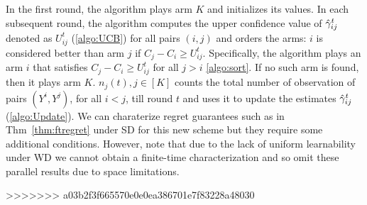 In the first round, the algorithm plays arm $K$ and initializes its values. In each subsequent round, the algorithm computes the upper confidence value of $\hat{\gamma}^t_{ij}$ denoted as $U^t_{ij}$ (\ref{algo:UCB}) for all pairs $(i,j)$ and orders the arms: $i$ is considered better than arm $j$ if $C_j-C_i \geq U^t_{ij}$. Specifically, the algorithm plays an arm $i$ that satisfies $C_j-C_i \geq U^t_{ij}$ for all $j>i$ \ref{algo:sort}. If no such arm is found, then it plays arm $K$.  $n_j(t), j\in [K] $ counts the total number of observation of pairs $(Y^i, Y^j)$, for all $i<j$, till round $t$ and uses it to update the estimates $\hat{\gamma}_{ij}^t$ (\ref{algo:Update}). We can charaterize regret guarantees such as in Thm~\ref{thm:ftregret} under SD for this new scheme but they require some additional conditions. However, note that due to the lack of uniform learnability under WD we cannot obtain a finite-time characterization and so omit these parallel results due to space limitations. 

>>>>>>> a03b2f3f665570e0e0ea386701e7f83228a48030
